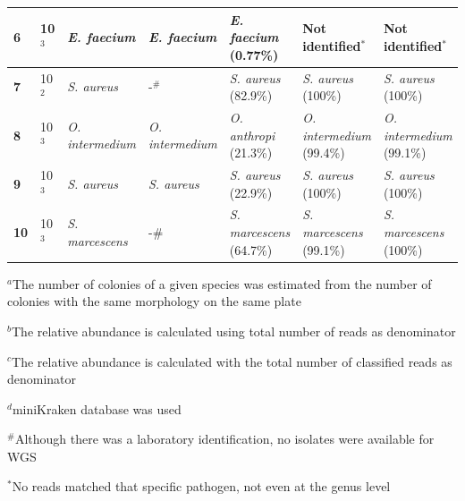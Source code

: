 \begin{table}[]
{\begin{tabular}{@{}|l|l|l|l|lll|@{}}
\textbf{6} &
  10$^3$ &
  \textit{E. faecium} &
  \textit{E. faecium} &
  \multicolumn{1}{l|}{\textit{E. faecium} (0.77\%)} &
  \multicolumn{1}{l|}{Not identified$^*$} &
  Not identified$^*$ \\ \midrule
\textbf{7} &
  10$^2$ &
  \textit{S. aureus} &
  -$^\#$ &
  \multicolumn{1}{l|}{\textit{S. aureus} (82.9\%)} &
  \multicolumn{1}{l|}{\textit{S. aureus} (100\%)} &
  \textit{S. aureus} (100\%) \\ \midrule
\textbf{8} &
  10$^3$ &
  \textit{O. intermedium} &
  \textit{O. intermedium} &
  \multicolumn{1}{l|}{\textit{O. anthropi} (21.3\%)} &
  \multicolumn{1}{l|}{\textit{O. intermedium} (99.4\%)} &
  \textit{O. intermedium} (99.1\%) \\ \midrule
\textbf{9} &
  10$^3$ &
  \textit{S. aureus} &
  \textit{S. aureus} &
  \multicolumn{1}{l|}{\textit{S. aureus} (22.9\%)} &
  \multicolumn{1}{l|}{\textit{S. aureus} (100\%)} &
  \textit{S. aureus} (100\%) \\ \midrule
\textbf{10} &
  10$^3$ &
  \textit{S. marcescens} &
  -\# &
  \multicolumn{1}{l|}{\textit{S. marcescens} (64.7\%)} &
  \multicolumn{1}{l|}{\textit{S. marcescens} (99.1\%)} &
  \textit{S. marcescens} (100\%) \\ \bottomrule
\end{tabular}%
}
\tiny
\item $^a$The number of colonies of a given species was estimated from the number of colonies with the same morphology on the same plate 
\item $^b$The relative abundance is calculated using total number of reads as denominator
\item $^c$The relative abundance is calculated with the total number of classified reads as denominator
\item $^d$miniKraken database was used
\item $^\#$Although there was a laboratory identification, no isolates were available for \ac{WGS}
\item $^*$No reads matched that specific pathogen, not even at the genus level
\end{table}

